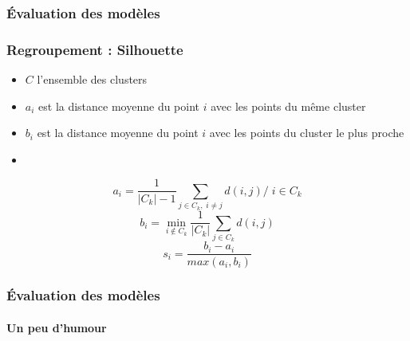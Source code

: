 \documentclass[xcolor=table]{beamer}
\begin{document}
\begin{frame}
	\frametitle{Évaluation des modèles}
	\frametitle{Regroupement : Silhouette}
	
		\begin{itemize}
		\item $C$ l'ensemble des clusters
		\item $a_i$ est la distance moyenne du point $i$ avec les points du même cluster
		\item $b_i$ est la distance moyenne du point $i$ avec les points du cluster le plus proche
		\item {}
	\end{itemize}
	
	\[a_i = \frac{1}{|C_k| - 1} \sum_{j \in C_k,\; i \ne j} d(i, j) / \; i \in C_k\]
	\[b_i = \min_{i \notin C_k} \frac{1}{|C_k|} \sum_{j \in C_k} d(i, j)\]
	\[s_i = \frac{b_i - a_i}{max(a_i, b_i)}\]
	
	
\end{frame}

\begin{frame}
	\frametitle{Évaluation des modèles}
	\framesubtitle{Un peu d'humour}
	
	\begin{center}
	\end{center}
	
\end{frame}

\end{document}
